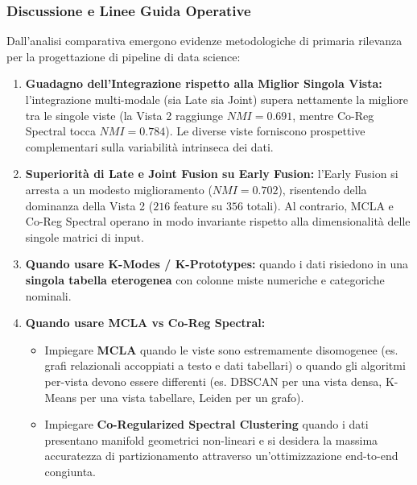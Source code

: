 \subsubsection{Discussione e Linee Guida Operative}
Dall'analisi comparativa emergono evidenze metodologiche di primaria rilevanza per la progettazione di pipeline di data science:
\begin{enumerate}
    \item \textbf{Guadagno dell'Integrazione rispetto alla Miglior Singola Vista:} l'integrazione multi-modale (sia Late sia Joint) supera nettamente la migliore tra le singole viste (la Vista 2 raggiunge $NMI=0.691$, mentre Co-Reg Spectral tocca $NMI=0.784$). Le diverse viste forniscono prospettive complementari sulla variabilità intrinseca dei dati.
    \item \textbf{Superiorità di Late e Joint Fusion su Early Fusion:} l'Early Fusion si arresta a un modesto miglioramento ($NMI=0.702$), risentendo della dominanza della Vista 2 ($216$ feature su $356$ totali). Al contrario, MCLA e Co-Reg Spectral operano in modo invariante rispetto alla dimensionalità delle singole matrici di input.
    \item \textbf{Quando usare K-Modes / K-Prototypes:} quando i dati risiedono in una \textbf{singola tabella eterogenea} con colonne miste numeriche e categoriche nominali.
    \item \textbf{Quando usare MCLA vs Co-Reg Spectral:}
    \begin{itemize}
        \item Impiegare \textbf{MCLA} quando le viste sono estremamente disomogenee (es. grafi relazionali accoppiati a testo e dati tabellari) o quando gli algoritmi per-vista devono essere differenti (es. DBSCAN per una vista densa, K-Means per una vista tabellare, Leiden per un grafo).
        \item Impiegare \textbf{Co-Regularized Spectral Clustering} quando i dati presentano manifold geometrici non-lineari e si desidera la massima accuratezza di partizionamento attraverso un'ottimizzazione end-to-end congiunta.
    \end{itemize}
\end{enumerate}
